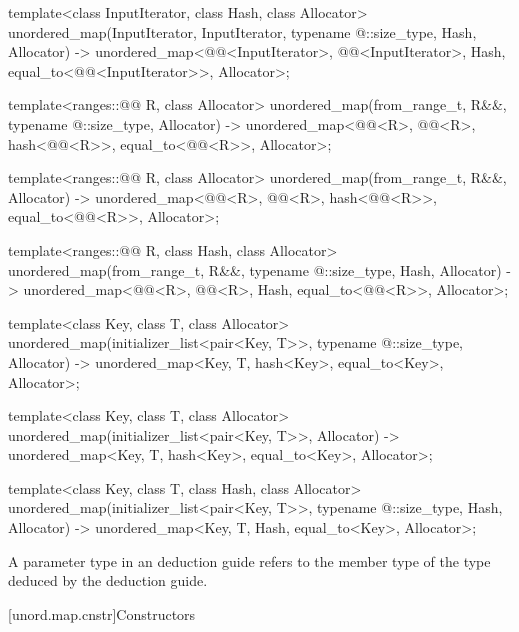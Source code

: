 \begin{codeblock}
{  template<class InputIterator, class Hash, class Allocator>
    unordered_map(InputIterator, InputIterator, typename @\seebelow@::size_type, Hash, Allocator)
      -> unordered_map<@@<InputIterator>, @@<InputIterator>, Hash,
                       equal_to<@@<InputIterator>>, Allocator>;

  template<ranges::@@ R, class Allocator>
    unordered_map(from_range_t, R&&, typename @\seebelow@::size_type, Allocator)
      -> unordered_map<@@<R>, @@<R>, hash<@@<R>>,
                       equal_to<@@<R>>, Allocator>;

  template<ranges::@@ R, class Allocator>
    unordered_map(from_range_t, R&&, Allocator)
      -> unordered_map<@@<R>, @@<R>, hash<@@<R>>,
                       equal_to<@@<R>>, Allocator>;

  template<ranges::@@ R, class Hash, class Allocator>
    unordered_map(from_range_t, R&&, typename @\seebelow@::size_type, Hash, Allocator)
      -> unordered_map<@@<R>, @@<R>, Hash,
                       equal_to<@@<R>>, Allocator>;

  template<class Key, class T, class Allocator>
    unordered_map(initializer_list<pair<Key, T>>, typename @\seebelow@::size_type,
                  Allocator)
      -> unordered_map<Key, T, hash<Key>, equal_to<Key>, Allocator>;

  template<class Key, class T, class Allocator>
    unordered_map(initializer_list<pair<Key, T>>, Allocator)
      -> unordered_map<Key, T, hash<Key>, equal_to<Key>, Allocator>;

  template<class Key, class T, class Hash, class Allocator>
    unordered_map(initializer_list<pair<Key, T>>, typename @\seebelow@::size_type, Hash,
                  Allocator)
      -> unordered_map<Key, T, Hash, equal_to<Key>, Allocator>;
}
\end{codeblock}

\pnum
A  parameter type in an  deduction guide
refers to the  member type of the type deduced by the deduction guide.

[unord.map.cnstr]{Constructors}

